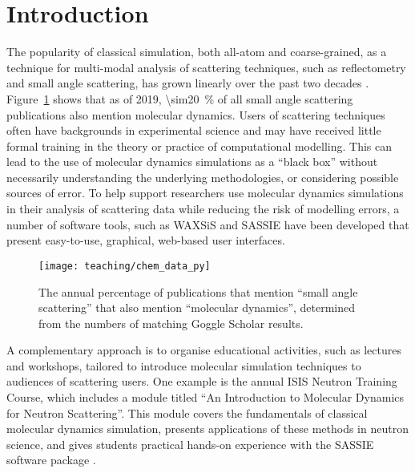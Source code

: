 \section{Introduction}
The popularity of classical simulation, both all-atom and coarse-grained, as a technique for multi-modal analysis of scattering techniques, such as reflectometry and small angle scattering, has grown linearly over the past two decades \cite{pan_molecular_2012,boldon_review_2015,hub_interpreting_2018,koutsioubas_combined_2016,darre_molecular_2015,scoppola_combining_2018}.
Figure~\ref{fig:growth} shows that as of 2019, \SI{\sim20}{\percent} of all small angle scattering publications also mention molecular dynamics.
Users of scattering techniques often have backgrounds in experimental science and may have received little formal training in the theory or practice of computational modelling.
This can lead to the use of molecular dynamics simulations as a ``black box'' without necessarily understanding the underlying methodologies, or considering possible sources of error.
To help support researchers use molecular dynamics simulations in their analysis of scattering data while reducing the risk of modelling errors, a number of software tools, such as WAXSiS and SASSIE \cite{chen_validating_2014,knight_waxsis_2015,perkins_atomistic_2016} have been developed that present easy-to-use, graphical, web-based user interfaces.
%
\begin{figure}
    \centering
    \texttt{[image: teaching/chem\_data\_py]}
    \caption{The annual percentage of publications that mention ``small angle scattering'' that also mention ``molecular dynamics'', determined from the numbers of matching Goggle Scholar results.}
    \label{fig:growth}
\end{figure}
%

A complementary approach is to organise educational activities, such as lectures and workshops, tailored to introduce molecular simulation techniques to audiences of scattering users.
One example is the annual ISIS Neutron Training Course, which includes a module titled ``An Introduction to Molecular Dynamics for Neutron Scattering''.
This module covers the fundamentals of classical molecular dynamics simulation, presents applications of these methods in neutron science, and gives students practical hands-on experience with the SASSIE software package \cite{perkins_atomistic_2016}.

